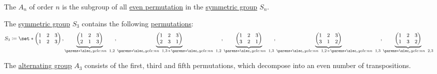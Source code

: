 \begin{definition}\label{def:alternating_group}
  The  \( A_n \) of order \( n \) is the subgroup of all \hyperref[def:permutation_parity]{even permutation} in the \hyperref[def:symmetric_group]{symmetric group} \( S_n \).
\end{definition}

\begin{example}\label{ex:s3_and_a3}
  The \hyperref[def:symmetric_group]{symmetric group} \( S_3 \) contains the following \hyperref[def:symmetric_group/permutation]{permutations}:
  \begin{equation*}
    S_3
    \coloneqq
    \set*
    {
      \begin{pmatrix}
        1 & 2 & 3 \\
        1 & 2 & 3
      \end{pmatrix},
      \underbrace
        {
          \begin{pmatrix}
            1 & 2 & 3 \\
            2 & 1 & 3
          \end{pmatrix}
        }_{
          \cycle{ 1, 2 }
        },
      \underbrace
        {
          \begin{pmatrix}
            1 & 2 & 3 \\
            2 & 3 & 1
          \end{pmatrix}
        }_{
          \cycle{ 1, 3 } \bincirc* \cycle{ 1, 2 }
        },
      \underbrace
        {
          \begin{pmatrix}
            1 & 2 & 3 \\
            3 & 2 & 1
          \end{pmatrix}
        }_{
          \cycle{ 1, 3 }
        },
      \underbrace
        {
          \begin{pmatrix}
            1 & 2 & 3 \\
            3 & 1 & 2
          \end{pmatrix}
        }_{
          \cycle{ 1, 2 } \bincirc* \cycle{ 1, 3 }
        },
      \underbrace
        {
          \begin{pmatrix}
            1 & 2 & 3 \\
            1 & 3 & 2
          \end{pmatrix}
        }_{
          \cycle{ 2, 3 }
        }
    }
  \end{equation*}

  The \hyperref[def:alternating_group]{alternating group} \( A_3 \) consists of the first, third and fifth permutations, which decompose into an even number of transpositions.


\end{example}
